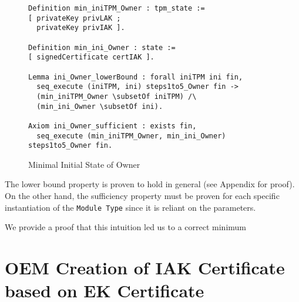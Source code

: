 \begin{figure}[h]
\begin{lstlisting}[language=Coq]
Definition min_iniTPM_Owner : tpm_state :=
[ privateKey privLAK ;
  privateKey privIAK ].

Definition min_ini_Owner : state :=
[ signedCertificate certIAK ].

Lemma ini_Owner_lowerBound : forall iniTPM ini fin,
  seq_execute (iniTPM, ini) steps1to5_Owner fin ->
  (min_iniTPM_Owner \subsetOf iniTPM) /\
  (min_ini_Owner \subsetOf ini).

Axiom ini_Owner_sufficient : exists fin,
  seq_execute (min_iniTPM_Owner, min_ini_Owner) steps1to5_Owner fin.
\end{lstlisting}
\caption{Minimal Initial State of Owner}
\end{figure}
The lower bound property is proven to hold in general (see Appendix for proof). On the other hand, the sufficiency property must be proven for each specific instantiation of the \verb|Module Type| since it is reliant on the parameters.




We provide a proof that this intuition led us to a correct minimum





\newpage
\section{OEM Creation of IAK Certificate based on EK Certificate}

